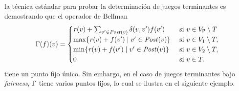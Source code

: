      




la técnica estándar para probar la determinación de juegos terminantes es demostrando que el operador de Bellman
%
\[
    \Gamma(f)(v) =
    \begin{cases}
           \mathit{r}(v)  + \sum_{v' \in \mathit{Post}(v)} \delta(v,v')  f(v') & \text{ si } v \in V_{\mathsf{P}} \setminus T  \\
          \max \{\mathit{r}(v)  + f(v') \mid v' \in \mathit{Post}(v) \}& \text{ si } v \in  V_1 \setminus T, \\
           \min \{\mathit{r}(v)  + f(v') \mid v' \in \mathit{Post}(v) \} & \text{ si } v \in  V_2 \setminus T, \\
           0 & \text{ si } v \in T.
    \end{cases}
\]
%
tiene un punto fijo único. Sin embargo, en el caso de juegos terminantes bajo \textit{fairness},  $\Gamma$ tiene varios puntos fijos, lo cual se ilustra en el siguiente ejemplo.

